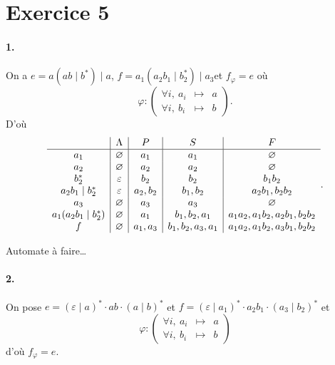 \section{Exercice 5}

\paragraph{1.}

On a $e = a(ab \mid b^*)  \mid a$, $f = a_1(a_2b_1 \mid b_2^*)  \mid a_3$\/et $f_\varphi = e$\/ où \[
	\varphi : \left(\begin{array}{ccc}
		\forall i,\:a_i&\longmapsto&a\\
		\forall i,\:b_i&\longmapsto&b
	\end{array}\right)
.\]
D'où
\[
	\begin{array}{c|c|c|c|c}
		&\Lambda&P&S&F\\\hline
		a_1&\varnothing&a_1&a_1&\varnothing\\
		a_2&\varnothing&a_2&a_2&\varnothing\\
		b_2^*&\varepsilon&b_2&b_2&b_1b_2\\
		a_2b_1 \mid b_2^*&\varepsilon&a_2,b_2&b_1,b_2&a_2b_1,b_2b_2\\
		a_3&\varnothing&a_3&a_3&\varnothing\\
		a_1(a_2b_1 \mid b_2^*)&\varnothing&a_1&b_1,b_2,a_1&a_1a_2,a_1b_2,a_2b_1,b_2b_2\\
		f&\varnothing&a_1,a_3&b_1,b_2,a_3,a_1&a_1a_2,a_1b_2,a_3b_1,b_2b_2
	\end{array}
.\]

Automate à faire\ldots

\paragraph{2.}
On pose $e = (\varepsilon  \mid a)^* \cdot ab\cdot (a \mid b)^*$\/ et $f = (\varepsilon  \mid a_1)^* \cdot a_2b_1\cdot (a_3 \mid b_2)^*$\/ et \[
	\varphi : \left(\begin{array}{ccc}
		\forall i,\:a_i&\longmapsto&a\\
		\forall i,\:b_i&\longmapsto&b
	\end{array}\right)
\] d'où $f_\varphi = e$.
